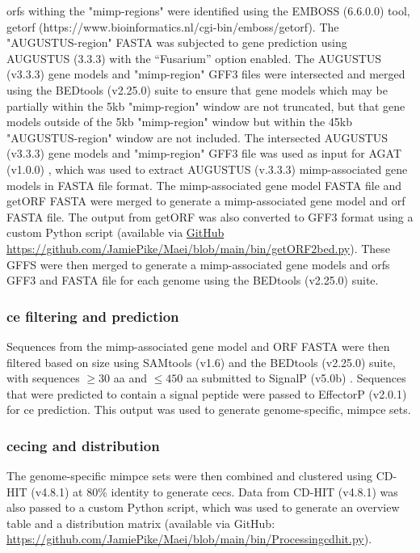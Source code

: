 \Acp{orf} withing the "\ac{mimp}-regions" were identified using the EMBOSS (6.6.0.0) tool, getorf (https://www.bioinformatics.nl/cgi-bin/emboss/getorf). The "AUGUSTUS-region" FASTA was subjected to gene prediction using AUGUSTUS (3.3.3) \parencite{Stanke2006} with the “Fusarium” option enabled. The AUGUSTUS (v3.3.3) gene models and "\ac{mimp}-region" GFF3 files were intersected and merged using the BEDtools (v2.25.0) suite \parencite{Quinlan2010} to ensure that gene models which may be partially within the 5kb "\ac{mimp}-region" window are not truncated, but that gene models outside of the 5kb "\ac{mimp}-region" window but within the 45kb "AUGUSTUS-region" window are not included. The intersected AUGUSTUS (v3.3.3) gene models and "\ac{mimp}-region" GFF3 file was used as input for AGAT (v1.0.0) \parencite{DainatN.D.}, which was used to extract AUGUSTUS (v.3.3.3) \ac{mimp}-associated gene models in FASTA file format. The \ac{mimp}-associated gene model FASTA file and getORF FASTA were merged to generate a \ac{mimp}-associated gene model and \ac{orf} FASTA file. The output from getORF was also converted to GFF3 format using a custom Python script (available via \href{https://github.com/JamiePike/Maei/blob/main/bin/getORF2bed.py}{ GitHub https://githu\-b.com/JamiePike/Maei/blob/main/bin/getORF2bed.py}). These GFFS were then merged to generate a \ac{mimp}-associated gene models and \acp{orf} GFF3 and FASTA file for each genome using the BEDtools (v2.25.0) suite.

\subsubsection{\ac{ce} filtering and prediction}

Sequences from the \ac{mimp}-associated gene model and ORF FASTA were then filtered based on size using SAMtools (v1.6) and the BEDtools (v2.25.0) suite, with sequences $\ge30$ aa and $\le450$ aa submitted to SignalP (v5.0b) \parencite{Petersen2011}. Sequences that were predicted to contain a signal peptide were passed to EffectorP (v2.0.1) \parencite{Sperschneider2018} for \ac{ce} prediction. This output was used to generate genome-specific, \ac{mimpce} sets.

\subsubsection{\Acl{cec}ing and distribution}

The genome-specific \ac{mimpce} sets were then combined and clustered using CD-HIT (v4.8.1) \parencite{Fu2012} at 80\% identity to generate \acfp{cec}. Data from CD-HIT (v4.8.1) was also passed to a custom Python script, which was used to generate an overview table and a distribution matrix (available via GitHub: \href{https://github.com/JamiePike/Maei/blob/main/bin/Processingcdhit.py}{https://github.com/Jamie\-Pike/Maei/blob/main/bin/Processingcdhit.py}).

